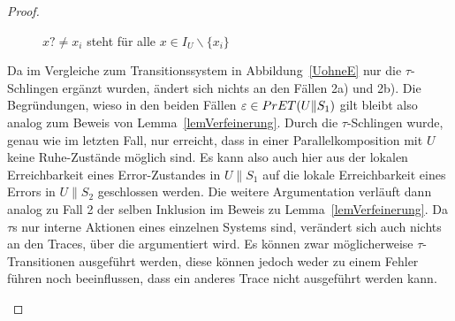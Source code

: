 \begin{proof}
\begin{itemize}
\begin{figure} [h!tbp]
\begin{center}
        \caption{$x?\neq x_i$ steht für alle $x\in I_U\backslash\{x_i\}$}
\label{UohneEmitTau}
      \end{center}
      \end{figure}
      Da im Vergleiche zum Transitionssystem in Abbildung~\ref{UohneE} nur die
      $\tau$-Schlingen ergänzt wurden, ändert sich nichts an den Fällen 2a) und
      2b). Die Begründungen, wieso in den beiden Fällen $\varepsilon\in
      PrET{}(U\|S_1)$ gilt bleibt also analog zum Beweis von
      Lemma~\ref{lemVerfeinerung}. Durch die $\tau$-Schlingen wurde, genau wie
      im letzten Fall, nur erreicht, dass in einer Parallelkomposition mit $U$
      keine Ruhe-Zustände möglich sind. Es kann also auch hier aus der lokalen
      Erreichbarkeit eines Error-Zustandes in $U\|S_1$ auf die lokale
      Erreichbarkeit eines Errors in $U\|S_2$ geschlossen werden. Die weitere
      Argumentation verläuft dann analog zu Fall 2 der selben Inklusion im
      Beweis zu Lemma~\ref{lemVerfeinerung}. Da $\tau$s nur interne Aktionen
      eines einzelnen Systems sind, verändert sich auch nichts an den Traces,
      über die argumentiert wird. Es können zwar möglicherweise
      $\tau$-Transitionen ausgeführt werden, diese können jedoch weder zu einem
      Fehler führen noch beeinflussen, dass ein anderes Trace nicht ausgeführt
      werden kann.
  \end{itemize}


\end{proof}
